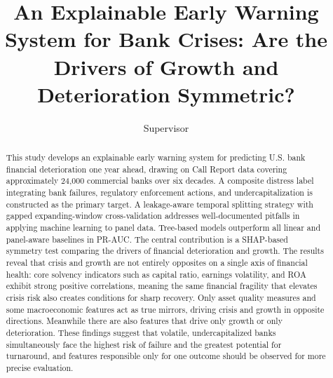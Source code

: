 \documentclass[conference]{IEEEtran}
\begin{document}
\title{An Explainable Early Warning System for Bank Crises: Are the Drivers of Growth and Deterioration Symmetric?\\
}

\author{
\and
Supervisor \\
}

\maketitle

\begin{abstract}
This study develops an explainable early warning system for predicting U.S. bank financial deterioration one year ahead, drawing on Call Report data covering approximately 24,000 commercial banks over six decades. A composite distress label integrating bank failures, regulatory enforcement actions, and undercapitalization is constructed as the primary target. A leakage-aware temporal splitting strategy with gapped expanding-window cross-validation addresses well-documented pitfalls in applying machine learning to panel data. Tree-based models outperform all linear and panel-aware baselines in PR-AUC. The central contribution is a SHAP-based symmetry test comparing the drivers of financial deterioration and growth. The results reveal that crisis and growth are not entirely opposites on a single axis of financial health: core solvency indicators such as capital ratio, earnings volatility, and ROA exhibit strong positive correlations, meaning the same financial fragility that elevates crisis risk also creates conditions for sharp recovery. Only asset quality measures and some macroeconomic features act as true mirrors, driving crisis and growth in opposite directions. Meanwhile there are also features that drive only growth or only deterioration. These findings suggest that volatile, undercapitalized banks simultaneously face the highest risk of failure and the greatest potential for turnaround, and features responsible only for one outcome should be observed for more precise evaluation. 
\end{abstract}
\end{document}
